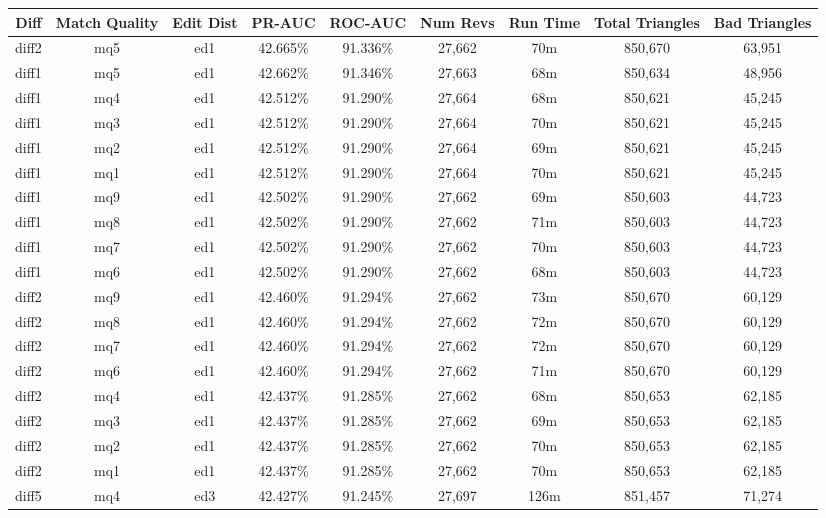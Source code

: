 \begin{sidewaystable}[!ph]
  \begin{center}
    \begin{tabular}{|c|c|c||c|c||c|c|c|c|}
\hline
Diff & Match Quality & Edit Dist
        & PR-AUC & ROC-AUC
        & Num Revs & Run Time
        & Total Triangles & Bad Triangles \\
\hline
\hline
diff2 & mq5 & ed1 & 42.665\% & 91.336\% & 27,662 & 70m & 850,670 & 63,951 \\
diff1 & mq5 & ed1 & 42.662\% & 91.346\% & 27,663 & 68m & 850,634 & 48,956 \\
diff1 & mq4 & ed1 & 42.512\% & 91.290\% & 27,664 & 68m & 850,621 & 45,245 \\
diff1 & mq3 & ed1 & 42.512\% & 91.290\% & 27,664 & 70m & 850,621 & 45,245 \\
diff1 & mq2 & ed1 & 42.512\% & 91.290\% & 27,664 & 69m & 850,621 & 45,245 \\
diff1 & mq1 & ed1 & 42.512\% & 91.290\% & 27,664 & 70m & 850,621 & 45,245 \\
diff1 & mq9 & ed1 & 42.502\% & 91.290\% & 27,662 & 69m & 850,603 & 44,723 \\
diff1 & mq8 & ed1 & 42.502\% & 91.290\% & 27,662 & 71m & 850,603 & 44,723 \\
diff1 & mq7 & ed1 & 42.502\% & 91.290\% & 27,662 & 70m & 850,603 & 44,723 \\
diff1 & mq6 & ed1 & 42.502\% & 91.290\% & 27,662 & 68m & 850,603 & 44,723 \\
diff2 & mq9 & ed1 & 42.460\% & 91.294\% & 27,662 & 73m & 850,670 & 60,129 \\
diff2 & mq8 & ed1 & 42.460\% & 91.294\% & 27,662 & 72m & 850,670 & 60,129 \\
diff2 & mq7 & ed1 & 42.460\% & 91.294\% & 27,662 & 72m & 850,670 & 60,129 \\
diff2 & mq6 & ed1 & 42.460\% & 91.294\% & 27,662 & 71m & 850,670 & 60,129 \\
diff2 & mq4 & ed1 & 42.437\% & 91.285\% & 27,662 & 68m & 850,653 & 62,185 \\
diff2 & mq3 & ed1 & 42.437\% & 91.285\% & 27,662 & 69m & 850,653 & 62,185 \\
diff2 & mq2 & ed1 & 42.437\% & 91.285\% & 27,662 & 70m & 850,653 & 62,185 \\
diff2 & mq1 & ed1 & 42.437\% & 91.285\% & 27,662 & 70m & 850,653 & 62,185 \\
diff5 & mq4 & ed3 & 42.427\% & 91.245\% & 27,697 & 126m & 851,457 & 71,274 \\

\end{tabular}
\end{center}
\end{sidewaystable}
